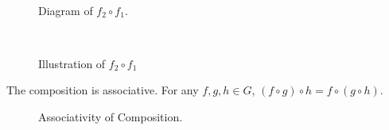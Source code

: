 \documentclass[11pt,openany]{article}
\begin{document}
\vfill
{}
\begin{note}[Diagram]
	\ \begin{figure}[h!]
		\centering
		
		\caption{Diagram of $f_2\circ f_1$.}
	\end{figure}
\end{note}
\newpage
\begin{note}[Illustration]
	\ \begin{figure}[h!]\centering
		\caption{Illustration of $f_2\circ f_1$}
	\end{figure}
\end{note}
\vfill
\begin{remark*}
	The composition is associative. For any \( f, g, h \in G \), $
	(f \circ g) \circ h = f \circ (g \circ h) $.
	\begin{figure}[h!]\centering
	\caption{Associativity of Composition.}
\end{figure}
\end{remark*}
\end{document}
